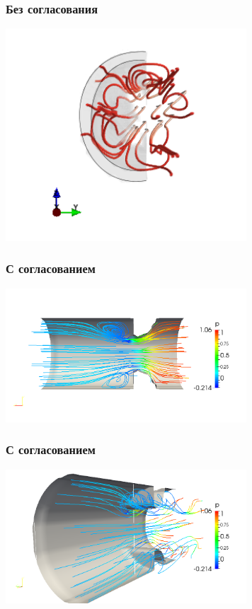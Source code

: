 \documentclass[14pt]{beamer}
\begin{document}
\begin{frame}
\frametitle{Без согласования}
    \begin{center}
    \includegraphics[width=9cm]{images/valves_resized_with_bound_front.png}
    \end{center}
\end{frame}

\begin{frame}
\frametitle{С согласованием}
    \begin{center}
    \includegraphics[width=9cm]{images/valves_simple.png}
    \end{center}
\end{frame}

\begin{frame}
\frametitle{С согласованием}
    \begin{center}
    \includegraphics[width=9cm]{images/valves_simple_angle.png}
    \end{center}
\end{frame}
\end{document}
